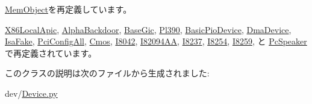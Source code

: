 \hyperlink{classMemObject_1_1MemObject_acce15679d830831b0bbe8ebc2a60b2ca}{MemObject}を再定義しています。

\hyperlink{classX86LocalApic_1_1X86LocalApic_acce15679d830831b0bbe8ebc2a60b2ca}{X86LocalApic}, \hyperlink{classAlphaBackdoor_1_1AlphaBackdoor_acce15679d830831b0bbe8ebc2a60b2ca}{AlphaBackdoor}, \hyperlink{classGic_1_1BaseGic_acce15679d830831b0bbe8ebc2a60b2ca}{BaseGic}, \hyperlink{classGic_1_1Pl390_acce15679d830831b0bbe8ebc2a60b2ca}{Pl390}, \hyperlink{classDevice_1_1BasicPioDevice_acce15679d830831b0bbe8ebc2a60b2ca}{BasicPioDevice}, \hyperlink{classDevice_1_1DmaDevice_acce15679d830831b0bbe8ebc2a60b2ca}{DmaDevice}, \hyperlink{classDevice_1_1IsaFake_acce15679d830831b0bbe8ebc2a60b2ca}{IsaFake}, \hyperlink{classPci_1_1PciConfigAll_acce15679d830831b0bbe8ebc2a60b2ca}{PciConfigAll}, \hyperlink{classCmos_1_1Cmos_acce15679d830831b0bbe8ebc2a60b2ca}{Cmos}, \hyperlink{classI8042_1_1I8042_acce15679d830831b0bbe8ebc2a60b2ca}{I8042}, \hyperlink{classI82094AA_1_1I82094AA_acce15679d830831b0bbe8ebc2a60b2ca}{I82094AA}, \hyperlink{classI8237_1_1I8237_acce15679d830831b0bbe8ebc2a60b2ca}{I8237}, \hyperlink{classI8254_1_1I8254_acce15679d830831b0bbe8ebc2a60b2ca}{I8254}, \hyperlink{classI8259_1_1I8259_acce15679d830831b0bbe8ebc2a60b2ca}{I8259}, と \hyperlink{classPcSpeaker_1_1PcSpeaker_acce15679d830831b0bbe8ebc2a60b2ca}{PcSpeaker}で再定義されています。

このクラスの説明は次のファイルから生成されました:\begin{DoxyCompactItemize}
\item 
dev/\hyperlink{Device_8py}{Device.py}\end{DoxyCompactItemize}
